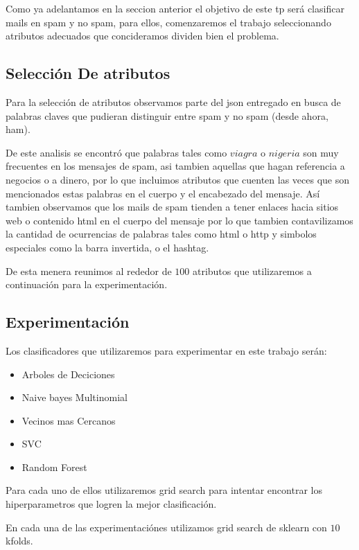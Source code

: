 Como ya adelantamos en la seccion anterior el objetivo de este tp será clasificar mails en spam y no spam, para ellos, comenzaremos el trabajo seleccionando atributos adecuados que concideramos dividen bien el problema.

\subsection{Selección De atributos}

Para la selección de atributos observamos parte del json entregado en busca de palabras claves que pudieran distinguir entre spam y no spam (desde ahora, ham).

De este analisis se encontró que palabras tales como $viagra$ o $nigeria$ son muy frecuentes en los mensajes de spam, asi tambien aquellas que hagan referencia a negocios o a dinero, por lo que incluimos atributos que cuenten las veces que son mencionados estas palabras en el cuerpo y el encabezado del mensaje. Así tambien observamos que los mails de spam tienden a tener enlaces hacia sitios web o contenido html en el cuerpo del mensaje por lo que tambien contavilizamos la cantidad de ocurrencias de palabras tales como html o http y simbolos especiales como la barra invertida, o el hashtag.

De esta menera reunimos al rededor de $100$ atributos que utilizaremos a continuación para la experimentación.

\subsection{Experimentación}

Los clasificadores que utilizaremos para experimentar en este trabajo serán: 

\begin{itemize}
\item	Arboles de Deciciones
\item	Naive bayes Multinomial
\item	Vecinos mas Cercanos
\item	SVC
\item	Random Forest
\end{itemize}

Para cada uno de ellos utilizaremos grid search para intentar encontrar los hiperparametros que logren la mejor clasificación.

En cada una de las experimentaciónes utilizamos grid search de sklearn con $10$ kfolds.

